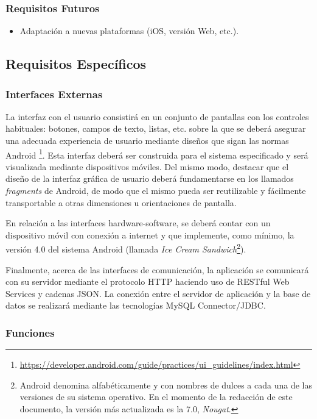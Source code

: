 \subsubsection{Requisitos Futuros}

\begin{itemize}	
	\item Adaptación a nuevas plataformas (iOS, versión Web, etc.).
\end{itemize}

\subsection{Requisitos Específicos}

\subsubsection{Interfaces Externas}

La interfaz con el usuario consistirá en un conjunto de pantallas con los controles habituales: botones, campos de texto, listas, etc. sobre la que se deberá asegurar una adecuada experiencia de usuario mediante diseños que sigan las normas Android \footnote{\url{https://developer.android.com/guide/practices/ui_guidelines/index.html}}. Esta interfaz deberá ser construida para el sistema especificado y será visualizada mediante dispositivos móviles. Del mismo modo, destacar que el diseño de la interfaz gráfica de usuario deberá fundamentarse en los llamados \emph{fragments} de Android, de modo que el mismo pueda ser reutilizable y fácilmente transportable a otras dimensiones u orientaciones de pantalla.

En relación a las interfaces hardware-software, se deberá contar con un dispositivo móvil con conexión a internet y que implemente, como mínimo, la versión 4.0 del sistema Android (llamada \emph{Ice Cream Sandwich}\footnote{Android denomina alfabéticamente y con nombres de dulces a cada una de las versiones de su sistema operativo. En el momento de la redacción de este documento, la versión más actualizada es la 7.0, \textit{Nougat}.}).

Finalmente, acerca de las interfaces de comunicación, la aplicación se comunicará con su servidor mediante el protocolo HTTP haciendo uso de RESTful Web Services y cadenas JSON. La conexión entre el servidor de aplicación y la base de datos se realizará mediante las tecnologías MySQL Connector/JDBC.

\subsubsection{Funciones}

